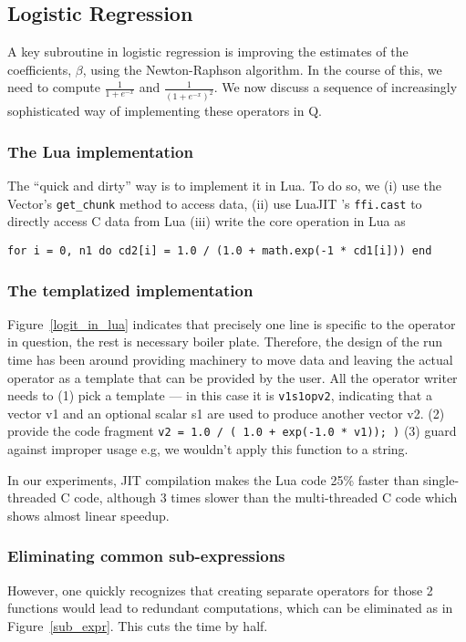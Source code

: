 \subsection{Logistic Regression}

A key subroutine in logistic regression \cite{Hastie2009} is improving the 
estimates of the
coefficients, \(\beta\), using the Newton-Raphson algorithm.
In the course of this, we need to compute
\(\frac{1}{1 + e^{-x}}\) and 
\(\frac{1}{(1 + e^{-x})^2}\).
We now discuss a sequence of increasingly sophisticated way of implementing
these operators in Q.

\subsubsection{The Lua implementation}
\label{Logit_Lua}
The ``quick and dirty'' way is to implement it in Lua. To do so, we 
(i) use the Vector's {\tt get\_chunk} method to access data, 
(ii) use LuaJIT 's {\tt ffi.cast} to directly access C data from Lua 
(iii) write the core operation in Lua as
\begin{verbatim}
for i = 0, n1 do cd2[i] = 1.0 / (1.0 + math.exp(-1 * cd1[i])) end
\end{verbatim}

\subsubsection{The templatized implementation}
\label{Logit_template}
Figure~\ref{logit_in_lua} indicates that precisely one line is specific to the
operator in question, the rest is necessary boiler plate. Therefore, the design
of the run time has been around providing machinery to move data and leaving
the actual operator as a template that can be provided by the user. All the operator
writer needs to (1) pick a template --- in this case it is {\tt v1s1opv2}, indicating that a
vector v1 and an optional scalar s1 are used to produce another vector v2.
(2) provide the code fragment {\tt  v2 = 1.0 / ( 1.0 + exp(-1.0 * v1)); )} (3)
guard against improper usage e.g, we wouldn't apply this function to a string.

In our experiments, 
JIT compilation makes the Lua code 25\% faster than single-threaded C code,
although 3 times slower than the multi-threaded C code which shows almost linear
speedup.

\subsubsection{Eliminating common sub-expressions}
However, one quickly recognizes that creating separate operators for those 2
functions would lead to 
redundant computations, which can be eliminated as in Figure~\ref{sub_expr}.
This cuts the time by half.

